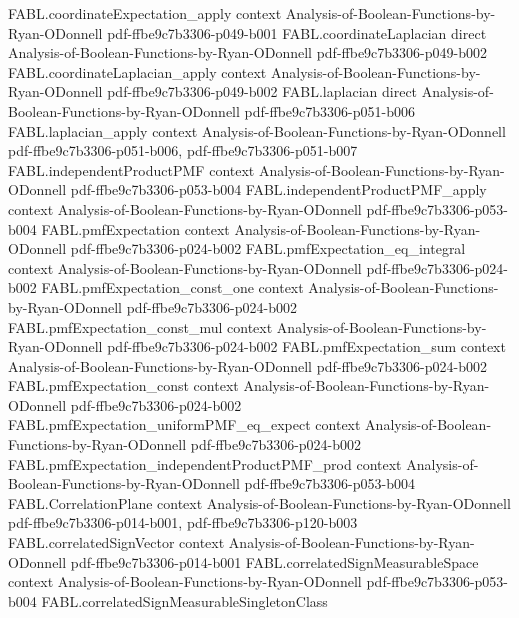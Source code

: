 \begin{theorem}
\proofstep
  {FABL.coordinateExpectation_apply}
  {context}
  {Analysis-of-Boolean-Functions-by-Ryan-ODonnell}
  {pdf-ffbe9c7b3306-p049-b001}
\proofstep
  {FABL.coordinateLaplacian}
  {direct}
  {Analysis-of-Boolean-Functions-by-Ryan-ODonnell}
  {pdf-ffbe9c7b3306-p049-b002}
\proofstep
  {FABL.coordinateLaplacian_apply}
  {context}
  {Analysis-of-Boolean-Functions-by-Ryan-ODonnell}
  {pdf-ffbe9c7b3306-p049-b002}
\proofstep
  {FABL.laplacian}
  {direct}
  {Analysis-of-Boolean-Functions-by-Ryan-ODonnell}
  {pdf-ffbe9c7b3306-p051-b006}
\proofstep
  {FABL.laplacian_apply}
  {context}
  {Analysis-of-Boolean-Functions-by-Ryan-ODonnell}
  {pdf-ffbe9c7b3306-p051-b006,
    pdf-ffbe9c7b3306-p051-b007}
\proofstep
  {FABL.independentProductPMF}
  {context}
  {Analysis-of-Boolean-Functions-by-Ryan-ODonnell}
  {pdf-ffbe9c7b3306-p053-b004}
\proofstep
  {FABL.independentProductPMF_apply}
  {context}
  {Analysis-of-Boolean-Functions-by-Ryan-ODonnell}
  {pdf-ffbe9c7b3306-p053-b004}
\proofstep
  {FABL.pmfExpectation}
  {context}
  {Analysis-of-Boolean-Functions-by-Ryan-ODonnell}
  {pdf-ffbe9c7b3306-p024-b002}
\proofstep
  {FABL.pmfExpectation_eq_integral}
  {context}
  {Analysis-of-Boolean-Functions-by-Ryan-ODonnell}
  {pdf-ffbe9c7b3306-p024-b002}
\proofstep
  {FABL.pmfExpectation_const_one}
  {context}
  {Analysis-of-Boolean-Functions-by-Ryan-ODonnell}
  {pdf-ffbe9c7b3306-p024-b002}
\proofstep
  {FABL.pmfExpectation_const_mul}
  {context}
  {Analysis-of-Boolean-Functions-by-Ryan-ODonnell}
  {pdf-ffbe9c7b3306-p024-b002}
\proofstep
  {FABL.pmfExpectation_sum}
  {context}
  {Analysis-of-Boolean-Functions-by-Ryan-ODonnell}
  {pdf-ffbe9c7b3306-p024-b002}
\proofstep
  {FABL.pmfExpectation_const}
  {context}
  {Analysis-of-Boolean-Functions-by-Ryan-ODonnell}
  {pdf-ffbe9c7b3306-p024-b002}
\proofstep
  {FABL.pmfExpectation_uniformPMF_eq_expect}
  {context}
  {Analysis-of-Boolean-Functions-by-Ryan-ODonnell}
  {pdf-ffbe9c7b3306-p024-b002}
\proofstep
  {FABL.pmfExpectation_independentProductPMF_prod}
  {context}
  {Analysis-of-Boolean-Functions-by-Ryan-ODonnell}
  {pdf-ffbe9c7b3306-p053-b004}
\proofstep
  {FABL.CorrelationPlane}
  {context}
  {Analysis-of-Boolean-Functions-by-Ryan-ODonnell}
  {pdf-ffbe9c7b3306-p014-b001,
    pdf-ffbe9c7b3306-p120-b003}
\proofstep
  {FABL.correlatedSignVector}
  {context}
  {Analysis-of-Boolean-Functions-by-Ryan-ODonnell}
  {pdf-ffbe9c7b3306-p014-b001}
\proofstep
  {FABL.correlatedSignMeasurableSpace}
  {context}
  {Analysis-of-Boolean-Functions-by-Ryan-ODonnell}
  {pdf-ffbe9c7b3306-p053-b004}
\proofstep
  {FABL.correlatedSignMeasurableSingletonClass}

\end{theorem}

